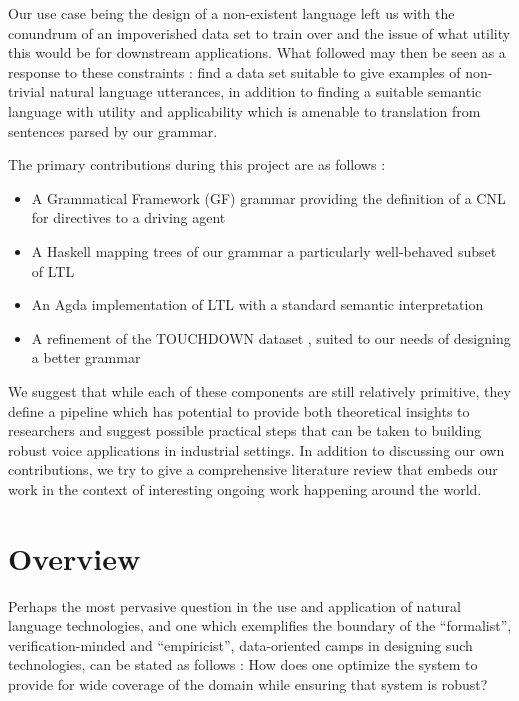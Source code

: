 \documentclass[a4paper, 11pt]{article}
\begin{document}
Our use case being the design of a non-existent language left us with the
conundrum of an impoverished data set to train over and the issue of what
utility this would be for downstream applications. What followed may then be
seen as a response to these constraints : find a data set suitable to give
examples of non-trivial natural language utterances, in addition to finding a
suitable semantic language with utility and applicability which is amenable to
translation from sentences parsed by our grammar.

The primary contributions during this project are as follows :

\begin{itemize}[noitemsep]
\item A Grammatical Framework (GF) grammar providing the definition of a CNL for
directives to a driving agent
\item A Haskell mapping trees of our grammar a particularly well-behaved subset of LTL
\item An Agda implementation of LTL with a standard semantic interpretation
\item A refinement of the TOUCHDOWN dataset \cite{chen2019touchdown}, suited to our needs of designing a
better grammar
\end{itemize}

We suggest that while each of these components are still relatively primitive,
they define a pipeline which has potential to provide both theoretical insights
to researchers and suggest possible practical steps that can be taken to
building robust voice applications in industrial settings. In addition to
discussing our own contributions, we try to give a comprehensive literature
review that embeds our work in the context of interesting ongoing work happening
around the world.

\section{Overview}

Perhaps the most pervasive question in the use and application of natural
language technologies, and one which exemplifies the boundary of the
``formalist'', verification-minded and ``empiricist'', data-oriented camps in
designing such technologies, can be stated as follows : How does one optimize
the system to provide for wide coverage of the domain while ensuring that system
is robust?
\end{document}
